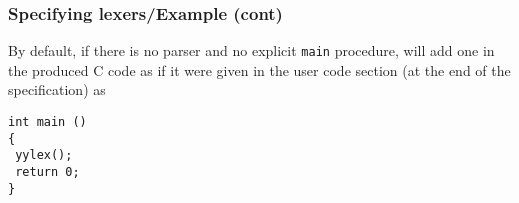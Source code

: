 % 
\begin{frame}[containsverbatim]
\frametitle{Specifying lexers/Example (cont)}
 
By default, if there is no parser and no explicit \texttt{main}
procedure, \Lex will add one in the produced C code as if it were
given in the user code section (at the end of the specification) as
{\small
\begin{verbatim}
int main ()
{
 yylex();
 return 0;
}
\end{verbatim}
}

\end{frame}
